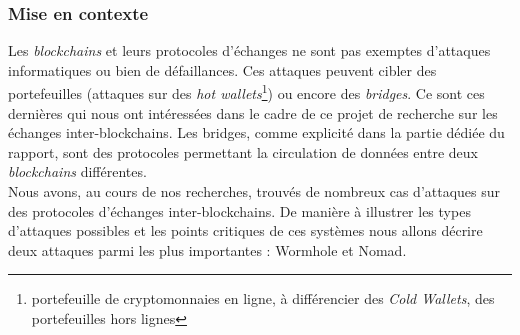 \subsubsection{Mise en contexte}
Les \textit{\gls{blockchain}s} et leurs protocoles d'échanges ne sont pas exemptes d'attaques informatiques ou bien de défaillances.
Ces attaques peuvent cibler des portefeuilles (attaques sur des \textit{hot wallets}\footnote{portefeuille de cryptomonnaies en ligne, à différencier des \textit{Cold Wallets}, des portefeuilles hors lignes}) ou encore des \textit{bridges}. 
Ce sont ces dernières qui nous ont intéressées dans le cadre de ce projet de recherche sur les échanges inter-\gls{blockchain}s. 
Les \gls{bridge}s, comme explicité dans la partie dédiée du rapport, sont des protocoles permettant la circulation de données entre deux \textit{\gls{blockchain}s} différentes.\\
Nous avons, au cours de nos recherches, trouvés de nombreux cas d'attaques sur des protocoles d'échanges inter-\gls{blockchain}s. 
De manière à illustrer les types d'attaques possibles et les points critiques de ces systèmes nous allons décrire deux attaques parmi les plus importantes : \gls{Wormhole} et \gls{Nomad}.

